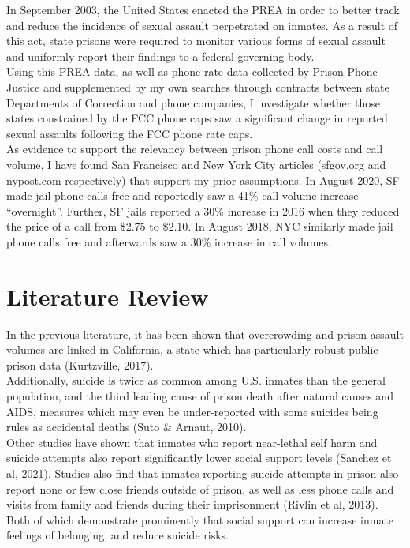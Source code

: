 In September 2003, the United States enacted the PREA in order to better track and reduce the incidence of sexual assault perpetrated on inmates. As a result of this act, state prisons were required to monitor various forms of sexual assault and uniformly report their findings to a federal governing body. \\

Using this PREA data, as well as phone rate data collected by Prison Phone Justice and supplemented by my own searches through contracts between state Departments of Correction and phone companies, I investigate whether those states constrained by the FCC phone caps saw a significant change in reported sexual assaults following the FCC phone rate caps. \\

As evidence to support the relevancy between prison phone call costs and call volume, I have found San Francisco and New York City articles (sfgov.org and nypost.com respectively) that support my prior assumptions. In August 2020, SF made jail phone calls free and reportedly saw a 41\% call volume increase ``overnight''. Further, SF jails reported a 30\% increase in 2016 when they reduced the price of a call from \$2.75 to \$2.10. In August 2018, NYC similarly made jail phone calls free and afterwards saw a 30\% increase in call volumes. \\

\section{Literature Review}
In the previous literature, it has been shown that overcrowding and prison assault volumes are linked in California, a state which has particularly-robust public prison data (Kurtzville, 2017). \\

Additionally, suicide is twice as common among U.S. inmates than the general population, and the third leading cause of prison death after natural causes and AIDS, measures which may even be under-reported with some suicides being rules as accidental deaths (Suto \& Arnaut, 2010). \\

Other studies have shown that inmates who report near-lethal self harm and suicide attempts also report significantly lower social support levels (Sanchez et al, 2021). Studies also find that inmates reporting suicide attempts in prison also report none or few close friends outside of prison, as well as less phone calls and visits from family and friends during their imprisonment (Rivlin et al, 2013). Both of which demonstrate prominently that social support can increase inmate feelings of belonging, and reduce suicide risks. \\


